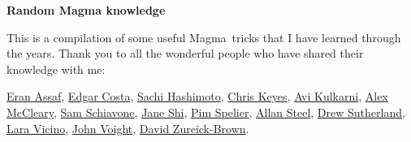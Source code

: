 \documentclass[12pt]{article}
\newcommand{\Magma}{\textsf{Magma}}
\begin{document}
\begin{center}
\begin{Large}
    \textbf{Random \textsf{Magma} knowledge}\\
\end{Large}
\end{center}

This is a compilation of some useful \Magma~tricks that I have learned through the years. Thank you to all the wonderful people who have shared their knowledge with me:

\href{https://math.dartmouth.edu/~eassaf/}{Eran Assaf},
\href{https://math.mit.edu/~edgarc/}{Edgar Costa},
\href{https://sachihashimoto.github.io}{Sachi Hashimoto},
\href{https://c-keyes.github.io}{Chris Keyes},
\href{https://math.dartmouth.edu/~akulkarn/}{Avi Kulkarni},
\href{https://www.alexmccleary.org}{Alex McCleary},
\href{https://math.mit.edu/~sschiavo/}{Sam Schiavone},
\href{https://janeshi99.github.io}{Jane Shi},
\href{https://sites.google.com/view/pim-spelier/home}{Pim Spelier},
\href{https://magma.maths.usyd.edu.au/users/allan/}{Allan Steel},
\href{https://math.mit.edu/~drew/}{Drew Sutherland}, 
\href{https://sites.google.com/view/laravicino/home-page}{Lara Vicino}, 
\href{https://jvoight.github.io}{John Voight},
\href{https://dmzb.github.io}{David Zureick-Brown}.
\end{document}
